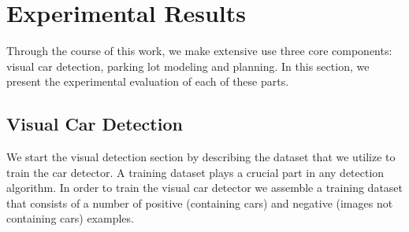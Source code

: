 
\chapter{Experimental Results}
\label{cha:experimental_results}

Through the course of this work, we make extensive use three core components:
visual car detection, parking lot modeling and planning. In this section, we
present the experimental evaluation of each of these parts.

\section{Visual Car Detection}
\label{sec:visual_car_detection}

We start the visual detection section by describing the dataset that we
utilize to train the car detector. A training dataset plays a crucial part in
any detection algorithm. In order to train the visual car detector we assemble
a training dataset that consists of a number of positive (containing cars) and
negative (images not containing cars) examples.

